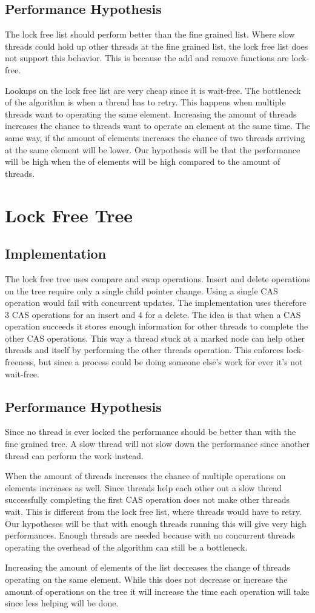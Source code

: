\documentclass[10pt,a4paper]{article}
\begin{document}
\subsection{Performance Hypothesis}
The lock free list should perform better than the fine grained list. Where slow threads
could hold up other threads at the fine grained list, the lock free list does not support 
this behavior. This is because the add and remove functions are lock-free.

Lookups on the lock free list are very cheap since it is wait-free. The bottleneck of the 
algorithm is when a thread has to retry. This happens when multiple threads want to operating the same element.
Increasing the amount of threads increases the chance to threads want to operate an element at the same time.
The same way, if the amount of elements increases the chance of two threads arriving
at the same element will be lower. Our hypothesis will be that the 
performance will be high when the of elements will be high compared to the
amount of threads.

\section{Lock Free Tree}
\subsection{Implementation}
The lock free tree uses compare and swap operations. Insert and delete
operations on the tree require only a single child pointer change. Using a single CAS operation
would fail with concurrent updates. The implementation uses therefore 3 CAS operations for an insert and
4 for a delete. The idea is that when a CAS operation succeeds it stores enough information
for other threads to complete the other CAS operations. This way a thread stuck at a marked node can help other
threads and itself by performing the other threads operation. This enforces lock-freeness, but since
a process could be doing someone else's work for ever it's not wait-free.


\subsection{Performance Hypothesis}
Since no thread is ever locked the performance should be better than with the fine grained tree. A slow
thread will not slow down the performance since another thread can perform the work instead.

When the amount of threads increases the chance of multiple operations on elements increases as well. Since
threads help each other out a slow thread successfully completing the first CAS operation does not make other
threads wait. This is different from the lock free list, where threads would have to retry. Our hypotheses will be that
with enough threads running this will give very high performances. Enough threads are needed because with no concurrent
threads operating the overhead of the algorithm can still be a bottleneck.

Increasing the amount of elements of the list decreases the change of threads operating on the same element.
While this does not decrease or increase the amount of operations on the tree it will increase the time each
operation will take since less helping will be done.
\end{document}
